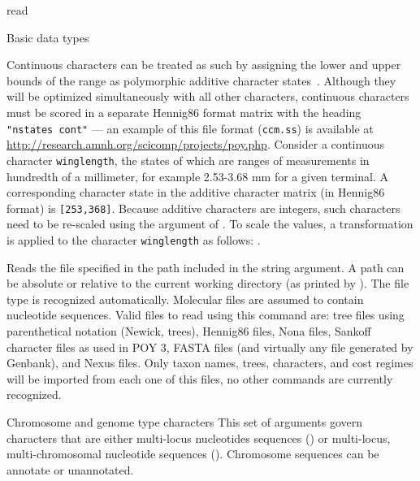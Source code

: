 \begin{command}{read}{}
\begin{arguments}
\begin{argumentgroup}{Basic data types}
             \begin{statement}
                Continuous characters can be treated as such by assigning the lower
                and upper bounds of the range as polymorphic additive character 
                states~\cite{goloboffetal2006}.    Although they will be optimized 
                simultaneously with all other characters, continuous characters 
                must be scored in a separate Hennig86 format matrix with the heading 
              \texttt{ "nstates cont"} --- an example of this file format (\texttt{ccm.ss}) is available at 
                \url{http://research.amnh.org/scicomp/projects/poy.php}.
                Consider a continuous character  \texttt{winglength}, the states of 
                which are ranges of measurements in hundredth of a millimeter,  
                for example 2.53-3.68 mm for a given terminal. A corresponding 
                character state in the  additive character matrix (in Hennig86 format) is 
                \texttt{[253,368]}. Because additive characters are integers, such 
                characters need to be re-scaled using the  
                argument of .  To scale the values, a transformation 
                is applied to the character \texttt{winglength} as follows:
                .
	        \end{statement}
             
                {Reads the file specified in the path included in the string argument.
                A path can be absolute or relative to the current working
                directory (as printed by ). The file type is
                recognized automatically.  Molecular files are assumed to
                contain nucleotide sequences. Valid files to read using this
                command are: tree files using parenthetical notation (Newick,
                \poy trees), Hennig86 files, Nona files, Sankoff character files
                as used in POY 3, FASTA files (and virtually any file generated
                by Genbank), and Nexus files. Only taxon names, trees,
                characters, and cost regimes will be imported from each one of
                this files, no other commands are currently recognized.}
                {}
     \end{argumentgroup}              
     

   \begin{argumentgroup}{Chromosome and genome type characters}          
     	This set of arguments govern characters that are either multi-locus nucleotides 
	sequences () or multi-locus, multi-chromosomal nucleotide
	sequences ().  Chromosome sequences can be \poyargument
	{annotate} or unannotated.
     

\end{argumentgroup}
\end{arguments}
\end{command}
